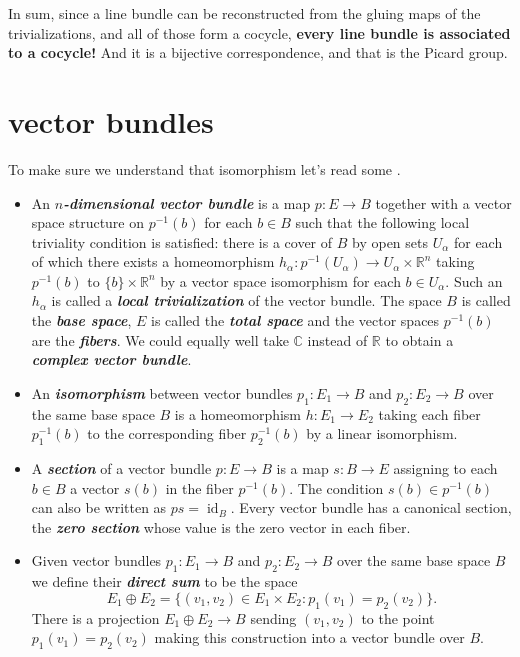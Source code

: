 \documentclass{article}
\newcommand{\R}{\mathbb{R}}
\newcommand{\C}{\mathbb{C}}
\DeclareMathOperator{\id}{id}
\begin{document}
{\color{cyan} In sum, since a line bundle can be reconstructed from the gluing maps of the trivializations, and all of those form a cocycle, \textbf{every line bundle is associated to a cocycle!} And it is a bijective correspondence, and that is the Picard group.}

\section{vector bundles}
To make sure we understand that isomorphism let's read some \cite{hatcher-vb}.

\begin{defn}\leavevmode
	\begin{itemize}
		\item An \textbf{\textit{$n$-dimensional vector bundle}} is a map $p:E\to B$ together with a vector space structure on $p^{-1}(b)$ for each $b\in B$ such that the following local triviality condition is satisfied: there is a cover of $B$ by open sets $U_\alpha$ for each of which there exists a homeomorphism $h_\alpha:p^{-1}(U_\alpha)\to U_\alpha\times\R^n$ taking $p^{-1}(b)$ to $\{b\}\times\R^n$ by a vector space isomorphism for each $b\in U_\alpha$. Such an $h_\alpha$ is called a \textbf{\textit{local trivialization}} of the vector bundle. The space $B$ is called the \textbf{\textit{base space}}, $E$ is called the \textbf{\textit{total space}} and the vector spaces $p^{-1}(b)$ are the \textbf{\textit{fibers}}. We could equally well take $\C$ instead of $\R$ to obtain a \textbf{\textit{complex vector bundle}}.
		
		\item An \textbf{\textit{isomorphism}} between vector bundles $p_1:E_1\to B$ and $p_2:E_2\to B$ over the same base space $B$ is a homeomorphism $h:E_1\to E_2$ taking each fiber $p_1^{-1}(b)$ to the corresponding fiber $p_2^{-1}(b)$ by a linear isomorphism.
		
		\item A \textbf{\textit{section}} of a vector bundle $p:E\to B$ is a map $s:B\to E$ assigning to each $b\in B$ a vector $s(b)$ in the fiber $p^{-1}(b)$. The condition $s(b)\in p^{-1}(b)$ can also be written as $ps=\id_B$. Every vector bundle has a canonical section, the \textbf{\textit{zero section}} whose value is the zero vector in each fiber.
		
		\item Given vector bundles $p_1:E_1\to B$ and $p_2:E_2\to B$ over the same base space $B$ we define their \textbf{\textit{direct sum}} to be the space
		\[E_1\oplus E_2=\{(v_1,v_2)\in E_1\times E_2:p_1(v_1)=p_2(v_2)\}.\]
		There is a projection $E_1\oplus E_2\to B$ sending $(v_1,v_2)$ to the point $p_1(v_1)=p_2(v_2)$ making this construction into a vector bundle over $B$.
		

\end{itemize}
\end{defn}
\end{document}
